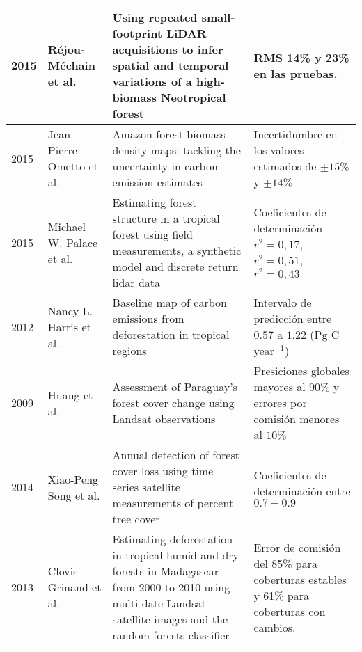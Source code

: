 \begin{longtable}{|p{3cm}|p{3cm}|p{3cm}|p{3cm}|}
		2015          & R\'ejou-M\'echain et al.                       & Using repeated small-footprint LiDAR acquisitions to infer spatial and temporal variations of a high-biomass Neotropical forest                                        & RMS 14\% y 23\% en las pruebas.                                                          \\ \hline
		2015          & Jean Pierre Ometto et al.                              & Amazon forest biomass density maps: tackling the uncertainty in carbon emission estimates                                                                              & Incertidumbre en los valores estimados de $ \pm 15\% $ y $ \pm 14\% $                     \\ \hline
		2015          & Michael W. Palace et al.                               & Estimating forest structure in a tropical forest using field measurements, a synthetic model and discrete return lidar data                                            & Coeficientes de determinaci\'on $ r^{2}=0,17 $, $ r^{2}=0,51 $, $ r^{2}=0,43 $            \\ \hline
		2012          & Nancy L. Harris et al.                                 & Baseline map of carbon emissions from deforestation in tropical regions                                                                                                & Intervalo de predicci\'on entre $ 0.57 $ a $ 1.22 $ (Pg C year$ ^{-1} $)                      \\ \hline
		2009          & Huang et al.                                           & Assessment of Paraguay's forest cover change using Landsat observations                                                                                                & Presiciones globales mayores al $90\%$ y errores por comisi\'on menores al $10\%$         \\ \hline
		2014          & Xiao-Peng Song et al.                                  & Annual detection of forest cover loss using time series satellite measurements of percent tree cover                                                                   & Coeficientes de determinaci\'on entre $ 0.7 - 0.9 $                                       \\ \hline
		2013          & Clovis Grinand et al.                                  & Estimating deforestation in tropical humid and dry forests in Madagascar from 2000 to 2010 using multi-date Landsat satellite images and the random forests classifier & Error de comisi\'on del 85\% para coberturas estables y 61\% para coberturas con cambios. \\ \hline

\end{longtable}

